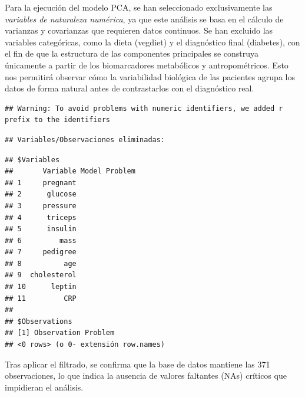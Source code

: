 \documentclass[
]{article}
\begin{document}
Para la ejecución del modelo PCA, se han seleccionado exclusivamente las
\emph{variables de naturaleza numérica}, ya que este análisis se basa en
el cálculo de varianzas y covarianzas que requieren datos continuos. Se
han excluido las variables categóricas, como la dieta (vegdiet) y el
diagnóstico final (diabetes), con el fin de que la estructura de las
componentes principales se construya únicamente a partir de los
biomarcadores metabólicos y antropométricos. Esto nos permitirá observar
cómo la variabilidad biológica de las pacientes agrupa los datos de
forma natural antes de contrastarlos con el diagnóstico real.

\begin{verbatim}
## Warning: To avoid problems with numeric identifiers, we added r prefix to the identifiers
\end{verbatim}

\begin{verbatim}
## Variables/Observaciones eliminadas:
\end{verbatim}

\begin{verbatim}
## $Variables
##       Variable Model Problem
## 1     pregnant              
## 2      glucose              
## 3     pressure              
## 4      triceps              
## 5      insulin              
## 6         mass              
## 7     pedigree              
## 8          age              
## 9  cholesterol              
## 10      leptin              
## 11         CRP              
## 
## $Observations
## [1] Observation Problem    
## <0 rows> (o 0- extensión row.names)
\end{verbatim}

Tras aplicar el filtrado, se confirma que la base de datos mantiene las
371 observaciones, lo que indica la ausencia de valores faltantes (NAs)
críticos que impidieran el análisis.
\end{document}
